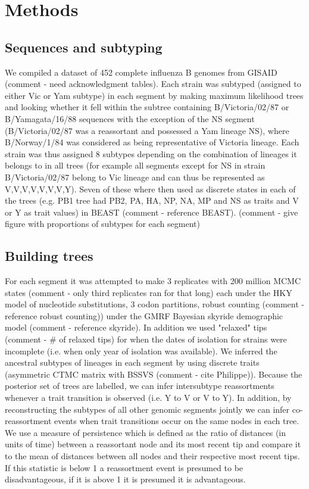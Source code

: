 \documentclass[11pt,oneside,letterpaper]{article}
\begin{document}
\section*{Methods}

\subsection*{Sequences and subtyping}
We compiled a dataset of 452 complete influenza B genomes from GISAID (comment - need acknowledgment tables). Each strain was subtyped (assigned to either Vic or Yam subtype) in each segment by making maximum likelihood trees and looking whether it fell within the subtree containing B/Victoria/02/87 or B/Yamagata/16/88 sequences with the exception of the NS segment (B/Victoria/02/87 was a reassortant and possessed a Yam lineage NS), where B/Norway/1/84 was considered as being representative of Victoria lineage.
Each strain was thus assigned 8 subtypes depending on the combination of lineages it belongs to in all trees (for example all segments except for NS in strain B/Victoria/02/87 belong to Vic lineage and can thus be represented as V,V,V,V,V,V,V,Y). Seven of these where then used as discrete states in each of the trees (e.g. PB1 tree had PB2, PA, HA, NP, NA, MP and NS as traits and V or Y as trait values) in BEAST (comment - reference BEAST). (comment - give figure with proportions of subtypes for each segment)

\subsection*{Building trees}
For each segment it was attempted to make 3 replicates with 200 million MCMC states (comment - only third replicates ran for that long) each under the HKY model of nucleotide substitutions, 3 codon partitions, robust counting (comment - reference robust counting)) under the GMRF Bayesian skyride demographic model (comment - reference skyride).
In addition we used "relaxed" tips (comment - \# of relaxed tips) for when the dates of isolation for strains were incomplete (i.e. when only year of isolation was available).
We inferred the ancestral subtypes of lineages in each segment by using discrete traits (asymmetric CTMC matrix with BSSVS (comment - cite Philippe)). Because the posterior set of trees are labelled, we can infer intersubtype reassortments whenever a trait transition is observed (i.e. Y to V or V to Y). In addition, by reconstructing the subtypes of all other genomic segments jointly we can infer co-reassortment events when trait transitions occur on the same nodes in each tree.
We use a measure of persistence which is defined as the ratio of distances (in units of time) between a reassortant node and its most recent tip and compare it to the mean of distances between all nodes and their respective most recent tips. If this statistic is below 1 a reassortment event is presumed to be disadvantageous, if it is above 1 it is presumed it is advantageous.
\end{document}
